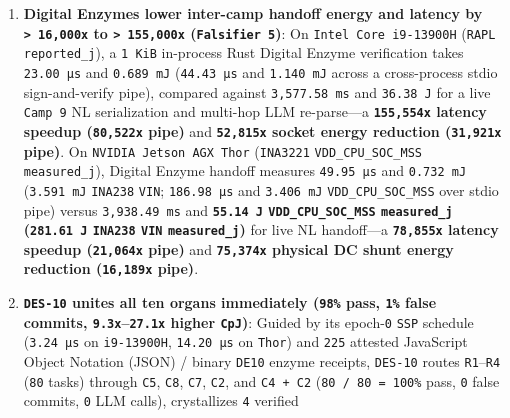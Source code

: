 \documentclass[10pt,letterpaper]{article}
\begin{document}
\begin{enumerate}
  \texttt{48\%} to \texttt{49\%} while still committing \texttt{51\%}
  false answers (\texttt{20/20} wrong on \texttt{R3}, \texttt{19/20}
  wrong on \texttt{R2}).
\item
  \textbf{Digital Enzymes lower inter-camp handoff energy and latency by
  \texttt{\textgreater{}\ 16,000x} to \texttt{\textgreater{}\ 155,000x}
  (\texttt{Falsifier\ 5})}: On \texttt{Intel\ Core\ i9-\allowbreak{}13900H}
  (\texttt{RAPL} \texttt{reported\_\allowbreak{}j}), a \texttt{1\ KiB} in-process
  Rust Digital Enzyme verification takes \texttt{23.00\ µs} and
  \texttt{0.689\ mJ} (\texttt{44.43\ µs} and \texttt{1.140\ mJ} across a
  cross-process stdio sign-and-verify pipe), compared against
  \texttt{3,\allowbreak{}577.\allowbreak{}58\ ms} and \texttt{36.38\ J} for a live
  \texttt{Camp\ 9} NL serialization and multi-hop LLM re-parse---a
  \textbf{\texttt{155,554x} latency speedup (\texttt{80,522x} pipe)} and
  \textbf{\texttt{52,815x} socket energy reduction (\texttt{31,921x}
  pipe)}. On \texttt{NVIDIA\ Jetson\ AGX\ Thor} (\texttt{INA3221}
  \texttt{VDD\_\allowbreak{}CPU\_\allowbreak{}SOC\_\allowbreak{}MSS} \texttt{measured\_\allowbreak{}j}), Digital Enzyme
  handoff measures \texttt{49.95\ µs} and \texttt{0.732\ mJ}
  (\texttt{3.591\ mJ} \texttt{INA238} \texttt{VIN}; \texttt{186.\allowbreak{}98\ µs}
  and \texttt{3.406\ mJ} \texttt{VDD\_\allowbreak{}CPU\_\allowbreak{}SOC\_\allowbreak{}MSS} over stdio pipe)
  versus \texttt{3,\allowbreak{}938.\allowbreak{}49\ ms} and \textbf{\texttt{55.14\ J}
  \texttt{VDD\_\allowbreak{}CPU\_\allowbreak{}SOC\_\allowbreak{}MSS} \texttt{measured\_\allowbreak{}j} (\texttt{281.61\ J}
  \texttt{INA238} \texttt{VIN} \texttt{measured\_\allowbreak{}j})} for live NL
  handoff---a \textbf{\texttt{78,855x} latency speedup (\texttt{21,064x}
  pipe)} and \textbf{\texttt{75,374x} physical DC shunt energy reduction
  (\texttt{16,189x} pipe)}.
\item
  \textbf{\texttt{DES-10} unites all ten organs immediately
  (\texttt{98\%} pass, \texttt{1\%} false commits,
  \texttt{9.3x}--\texttt{27.1x} higher \texttt{CpJ})}: Guided by its
  epoch-\texttt{0} \texttt{SSP} schedule (\texttt{3.24\ µs} on
  \texttt{i9-13900H}, \texttt{14.20\ µs} on \texttt{Thor}) and
  \texttt{225} attested JavaScript Object Notation (JSON) / binary
  \texttt{DE10} enzyme receipts, \texttt{DES-10} routes
  \texttt{R1}--\texttt{R4} (\texttt{80} tasks) through \texttt{C5},
  \texttt{C8}, \texttt{C7}, \texttt{C2}, and \texttt{C4\ +\ C2}
  (\texttt{80\ /\allowbreak{}\ 80\ =\ 100\%} pass, \texttt{0} false commits,
  \texttt{0} LLM calls), crystallizes \texttt{4} verified

\end{enumerate}
\end{document}
